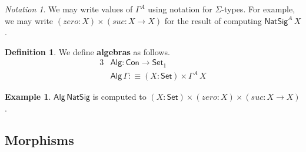 \documentclass[12pt,a4paper,twoside,openany]{book}
\theoremstyle{remark}
\newtheorem{notation}{Notation}
\theoremstyle{definition}
\newtheorem{mydefinition}{Definition}
\newtheorem{myexample}{Example}
\theoremstyle{theorem}
\newcommand{\mi}[1]{\mathit{#1}}
\newcommand{\ms}[1]{\mathsf{#1}}
\newcommand{\Con}{\mathsf{Con}}
\newcommand{\Set}{\mathsf{Set}}
\newcommand{\Alg}{\ms{Alg}}
\newcommand{\defn}{:\equiv}
\begin{document}
\begin{notation}
We may write values of $\Gamma^A$ using notation for $\Sigma$-types. For
example, we may write $(\mi{zero} : X) \times (\mi{suc} : X \to X)$ for the
result of computing $\ms{NatSig}^A\,X$.
\end{notation}

\begin{mydefinition} We define \textbf{algebras} as follows.
\begin{alignat*}{3}
  & \Alg : \Con \to \Set_1 \\
  & \Alg\,\Gamma \defn (X : \Set) \times \Gamma^A\,X
\end{alignat*}
\end{mydefinition}

\begin{myexample} $\Alg\,\ms{NatSig}$ is computed to $(X : \Set)\times(\mi{zero} :
X)\times(\mi{suc} : X \to X)$.
\end{myexample}

\subsection{Morphisms}
\end{document}
